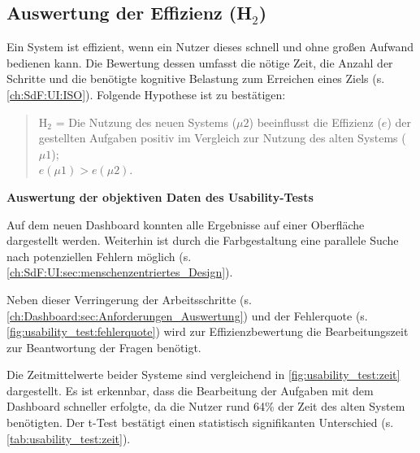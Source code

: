 \subsection{Auswertung der Effizienz (H$_{2}$)}
\label{ch:Ergebnisse:sec:Hypothesen_Auswertung:sub:Effizienz}
Ein System ist effizient, wenn ein Nutzer dieses schnell und ohne großen Aufwand bedienen kann. Die Bewertung dessen umfasst die nötige Zeit, die Anzahl der Schritte und die benötigte kognitive Belastung zum Erreichen eines Ziels (s. \autoref{ch:SdF:UI:ISO}).
Folgende Hypothese ist zu bestätigen:
\begin{quote}
    H$_{2}$ = Die Nutzung des neuen Systems ($\mu2$) beeinflusst die Effizienz ($e$) der gestellten Aufgaben positiv im Vergleich zur Nutzung des alten Systems ($\mu1$);\\
    $e(\mu1) > e(\mu2)$.
\end{quote}

\noindent
\textbf{Auswertung der objektiven Daten des Usability-Tests}\\

\noindent

Auf dem neuen Dash\-board konnten alle Ergebnisse auf einer Oberfläche dargestellt werden. Weiterhin ist durch die Farbgestaltung eine parallele Suche nach potenziellen Fehlern möglich (s. \autoref{ch:SdF:UI:sec:menschenzentriertes_Design}).

Neben dieser Verringerung der Arbeitsschritte (s. \autoref{ch:Dashboard:sec:Anforderungen_Auswertung}) und der Fehlerquote (s. \autoref{fig:usability_test:fehlerquote}) wird zur Effizienzbewertung die Bearbeitungszeit zur Beantwortung der Fragen benötigt.

Die Zeitmittelwerte beider Systeme sind vergleichend in \autoref{fig:usability_test:zeit} dargestellt. Es ist erkennbar, dass die Bearbeitung der Aufgaben mit dem Dash\-board schneller erfolgte, da die Nutzer rund 64\% der Zeit des alten System benötigten. Der t-Test bestätigt einen statistisch signifikanten Unterschied (s. \autoref{tab:usability_test:zeit}).

